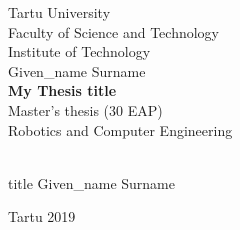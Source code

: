 \documentclass[12pt]{report}
\begin{document}
\thispagestyle{empty}
\begin{large}
\begin{center}
\vspace{20mm}
Tartu University
\\[5mm]
Faculty of Science and Technology
\\[5mm]
Institute of Technology
\\[5mm]
\vspace{50mm}
Given\_name Surname
\\[10mm]
\textbf{My Thesis title}
\\[10mm]
Master's thesis (30 EAP)\\
Robotics and Computer Engineering\\
\end{center}
\vspace{20mm}
\\[5mm]
title Given\_name Surname\\
\begin{center}
\vspace{65mm}
Tartu 2019\\
\end{center}
\end{large}
\newpage
\end{document}
